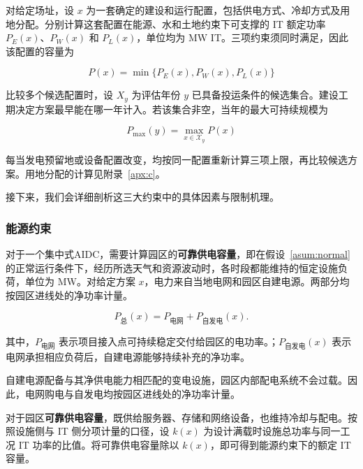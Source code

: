 对给定场址，设 $x$ 为一套确定的建设和运行配置，包括供电方式、冷却方式及用地分配。分别计算这套配置在能源、水和土地约束下可支撑的 IT 额定功率 $P_E(x)$、$P_W(x)$ 和 $P_L(x)$，单位均为 MW IT。三项约束须同时满足，因此该配置的容量为

\begin{equation}\label{eq:q1-capacity}
P(x) = \min\{P_E(x), P_W(x), P_L(x)\}
\end{equation}

比较多个候选配置时，设 $X_y$ 为评估年份 $y$ 已具备投运条件的候选集合。建设工期决定方案最早能在哪一年计入。若该集合非空，当年的最大可持续规模为

\begin{equation}\label{eq:q1-pmax}
P_{\max}(y)=\max_{x\in\mathcal X_y}P(x)
\end{equation}

每当发电预留地或设备配置改变，均按同一配置重新计算三项上限，再比较候选方案。用地分配的计算见附录~\ref{apx:c}。

接下来，我们会详细剖析这三大约束中的具体因素与限制机理。

\subsubsection{能源约束}\label{sec:q1-energy}

对于一个集中式AIDC，需要计算园区的\textbf{可靠供电容量}，即在假设~\ref{asum:normal} 的正常运行条件下，经历所选天气和资源波动时，各时段都能维持的恒定设施负荷，单位为 MW。对给定方案 $x$，电力来自当地电网和园区自建电源。两部分均按园区进线处的净功率计量。

\begin{equation}\label{eq:q1-ptotal}
P_{\text{总}}(x)=P_{\text{电网}}+P_{\text{自发电}}(x).
\end{equation}

其中，$P_{\text{电网}}$ 表示项目接入点可持续稳定交付给园区的电功率。；$P_{\text{自发电}}(x)$ 表示电网承担相应负荷后，自建电源能够持续补充的净功率。

\begin{asum}[配套设施能够输送设计功率]\label{asum:facility}
自建电源配备与其净供电能力相匹配的变电设施，园区内部配电系统不会过载。因此，电网购电与自发电均按园区进线处的净功率计量。
\end{asum}

对于园区\textbf{可靠供电容量}，既供给服务器、存储和网络设备，也维持冷却与配电。按照设施侧与 IT 侧分项计量的口径\cite{q1ref01}，设 $k(x)$ 为设计满载时设施总功率与同一工况 IT 功率的比值。将可靠供电容量除以 $k(x)$，即可得到能源约束下的额定 IT 容量。

